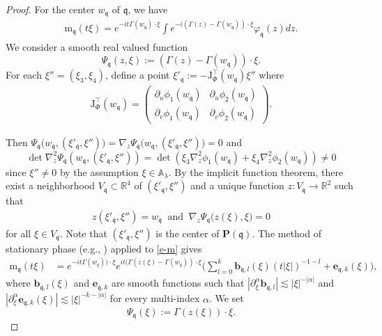 \documentclass[10pt] %
{amsart}
\theoremstyle{plain}
\numberwithin{equation}{section}
\newcommand{\fq}{\mathfrak q}
\begin{document}
 
 \begin{proof}
For the center $w_\fq$ of $\fq$, we have 
\begin{align}\label{e-m}	
\mathrm m_\fq (t \xi) =  e^{ -i t \Gamma(w_\fq)\cdot \xi }\int e^{-i (\Gamma(z) - \Gamma(w_\fq))\cdot \xi } \varphi_\fq(z) dz .
\end{align}
We consider a smooth real valued  function 
\[  
\Psi_\fq (z, \xi) := (\Gamma(z)  - \Gamma(w_\fq) )\cdot \xi. 
\]
For each $\xi'' =(\xi_3,\xi_4)$, define a point 
$\xi'_\fq :=-\mathrm J_\Phi^\intercal(w_\fq) \xi''$ where
\begin{align}\label{Jwq}
\mathrm J_\Phi^\intercal(w_\fq) = \begin{pmatrix}
  \partial_u \phi_1(w_\fq) & \partial_u \phi_2(w_\fq)  \\ \partial_v \phi_1(w_\fq) & \partial_v \phi_2(w_\fq) \end{pmatrix}.
\end{align}


Then 
$
\Psi_\fq\big(w_\fq, (\xi'_\fq,\xi'')\big) = \nabla_z \Psi_\fq\big(w_\fq ,(\xi'_\fq, \xi'')  \big)= 0 
$
and 
\[
\det \nabla^2_{z} \Psi_{\fq} (w_\fq,( \xi'_\fq, \xi''))  = \det(\xi_3 \nabla^2_{z} \phi_1(w_\fq) + \xi_4 \nabla^2_{z} \phi_2(w_\fq) ) \neq 0  
\]
since  $\xi''\neq 0$ by the assumption $\xi \in \mathbb A_\lambda$.
By the implicit function theorem, there exist a neighborhood $V_\fq\subset \mathbb R^4$ of $( \xi'_\fq, \xi'')$ and a unique function $z : V_\fq \to \mathbb R^2$ such that  
\begin{align}\label{nablazero}
 z( \xi'_\fq, \xi'') = w_\fq ~\text{ and }~  \nabla_{z} \Psi_\fq \big(z(\xi),\xi \big)= 0  
\end{align}
for all $\xi \in V_\fq$. 
Note that $( \xi'_\fq, \xi'')$ is the center of $\mathbf P(\fq)$.
The method of stationary phase  (e.g., \cite[Theorem 7.7.6]{H}) applied to \eqref{e-m} gives
\begin{align}\label{expand_m}
\mathrm m_\fq (t \xi)
& = e^{ -i t \Gamma(w_q))\cdot \xi }
e^{it(\Gamma(z(\xi)-\Gamma(w_q))\cdot \xi}\Big(\sum_{l=0}^k \mathbf b_{\fq,l}(\xi) (t |\xi| )^{-1-l} + \mathbf e_{\fq,k} (\xi) \Big),
\end{align}
where $\mathbf b_{\fq,l} (\xi)    $ and $\mathbf e_{\fq,k}  $ are smooth functions such that $|\partial_\xi^\alpha \mathbf b_{\fq,l} | \lesssim |\xi|^{-|\alpha|}$ and $|\partial_\xi^\alpha \mathbf e_{\fq,k} (\xi)| \lesssim |\xi|^{-k-|\alpha| }$ for every multi-index $\alpha$. 
We set
\begin{equation}\label{phase-multiplier}
\Psi_\fq (\xi ) := \Gamma(z(\xi))\cdot \xi .
\end{equation}


\end{proof}
\end{document}

